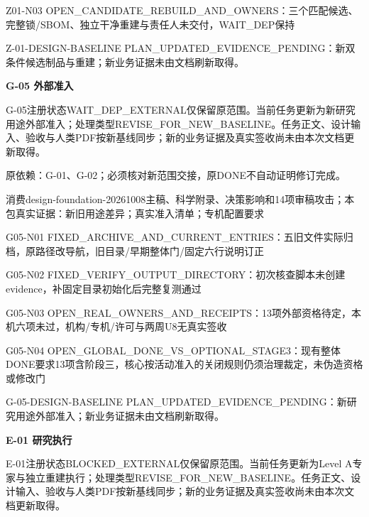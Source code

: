 \documentclass[11pt,a4paper]{article}
\newcommand{\reviewsection}[1]{\par\Needspace{5\baselineskip}\vspace{10pt}\begin{center}{\titlelatin\titlecjk\bfseries\fontsize{14}{20}\selectfont #1}\end{center}}
\begin{document}
Z01-\allowbreak{}N03 OPEN\_\allowbreak{}CANDIDATE\_\allowbreak{}REBUILD\_\allowbreak{}AND\_\allowbreak{}OWNERS：三个匹配候选、完整锁/\allowbreak{}SBOM、独立干净重建与责任人未交付，WAIT\_\allowbreak{}DEP保持


Z-\allowbreak{}01-\allowbreak{}DESIGN-\allowbreak{}BASELINE PLAN\_\allowbreak{}UPDATED\_\allowbreak{}EVIDENCE\_\allowbreak{}PENDING：新双条件候选制品与重建；新业务证据未由文档刷新取得。


\reviewsection{G-\allowbreak{}05 外部准入}
G-\allowbreak{}05注册状态WAIT\_\allowbreak{}DEP\_\allowbreak{}EXTERNAL仅保留原范围。当前任务更新为新研究用途外部准入；处理类型REVISE\_\allowbreak{}FOR\_\allowbreak{}NEW\_\allowbreak{}BASELINE。任务正文、设计输入、验收与人类PDF按新基线同步；新的业务证据及真实签收尚未由本次文档更新取得。


原依赖：G-\allowbreak{}01、G-\allowbreak{}02；必须核对新范围交接，原DONE不自动证明修订完成。


消费design-\allowbreak{}foundation-\allowbreak{}20261008主稿、科学附录、决策影响和14项审稿攻击；本包真实证据：新旧用途差异；真实准入清单；专机配置要求


G05-\allowbreak{}N01 FIXED\_\allowbreak{}ARCHIVE\_\allowbreak{}AND\_\allowbreak{}CURRENT\_\allowbreak{}ENTRIES：五旧文件实际归档，原路径改导航，旧目录/\allowbreak{}早期整体门/\allowbreak{}固定六行说明订正


G05-\allowbreak{}N02 FIXED\_\allowbreak{}VERIFY\_\allowbreak{}OUTPUT\_\allowbreak{}DIRECTORY：初次核查脚本未创建evidence，补固定目录初始化后完整复测通过


G05-\allowbreak{}N03 OPEN\_\allowbreak{}REAL\_\allowbreak{}OWNERS\_\allowbreak{}AND\_\allowbreak{}RECEIPTS：13项外部资格待定，本机六项未过，机构/\allowbreak{}专机/\allowbreak{}许可与两周U8无真实签收


G05-\allowbreak{}N04 OPEN\_\allowbreak{}GLOBAL\_\allowbreak{}DONE\_\allowbreak{}VS\_\allowbreak{}OPTIONAL\_\allowbreak{}STAGE3：现有整体DONE要求13项含阶段三，核心按活动准入的关闭规则仍须治理裁定，未伪造资格或修改门


G-\allowbreak{}05-\allowbreak{}DESIGN-\allowbreak{}BASELINE PLAN\_\allowbreak{}UPDATED\_\allowbreak{}EVIDENCE\_\allowbreak{}PENDING：新研究用途外部准入；新业务证据未由文档刷新取得。


\reviewsection{E-\allowbreak{}01 研究执行}
E-\allowbreak{}01注册状态BLOCKED\_\allowbreak{}EXTERNAL仅保留原范围。当前任务更新为Level A专家与独立重建执行；处理类型REVISE\_\allowbreak{}FOR\_\allowbreak{}NEW\_\allowbreak{}BASELINE。任务正文、设计输入、验收与人类PDF按新基线同步；新的业务证据及真实签收尚未由本次文档更新取得。
\end{document}
